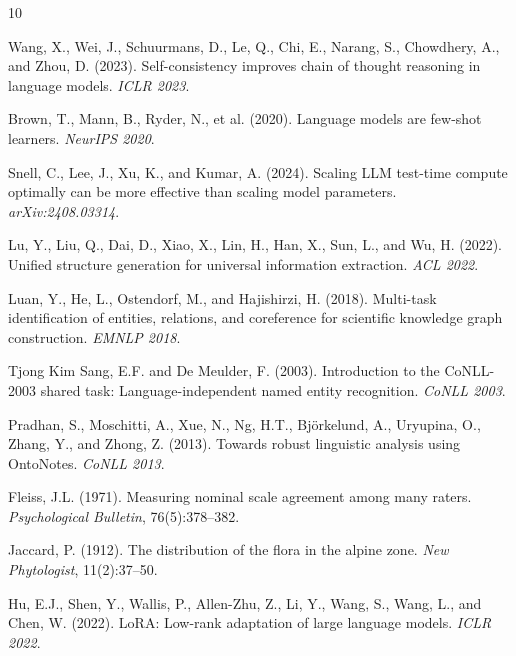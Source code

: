 \documentclass[11pt,a4paper]{article}
\begin{document}

\begin{thebibliography}{10}

Wang, X., Wei, J., Schuurmans, D., Le, Q., Chi, E., Narang, S., Chowdhery, A., and Zhou, D. (2023).
Self-consistency improves chain of thought reasoning in language models.
\textit{ICLR 2023}.

Brown, T., Mann, B., Ryder, N., et al. (2020).
Language models are few-shot learners.
\textit{NeurIPS 2020}.

Snell, C., Lee, J., Xu, K., and Kumar, A. (2024).
Scaling LLM test-time compute optimally can be more effective than scaling model parameters.
\textit{arXiv:2408.03314}.

Lu, Y., Liu, Q., Dai, D., Xiao, X., Lin, H., Han, X., Sun, L., and Wu, H. (2022).
Unified structure generation for universal information extraction.
\textit{ACL 2022}.

Luan, Y., He, L., Ostendorf, M., and Hajishirzi, H. (2018).
Multi-task identification of entities, relations, and coreference for scientific knowledge graph construction.
\textit{EMNLP 2018}.

Tjong Kim Sang, E.F. and De Meulder, F. (2003).
Introduction to the CoNLL-2003 shared task: Language-independent named entity recognition.
\textit{CoNLL 2003}.

Pradhan, S., Moschitti, A., Xue, N., Ng, H.T., Bj\"{o}rkelund, A., Uryupina, O., Zhang, Y., and Zhong, Z. (2013).
Towards robust linguistic analysis using OntoNotes.
\textit{CoNLL 2013}.

Fleiss, J.L. (1971).
Measuring nominal scale agreement among many raters.
\textit{Psychological Bulletin}, 76(5):378--382.

Jaccard, P. (1912).
The distribution of the flora in the alpine zone.
\textit{New Phytologist}, 11(2):37--50.

Hu, E.J., Shen, Y., Wallis, P., Allen-Zhu, Z., Li, Y., Wang, S., Wang, L., and Chen, W. (2022).
LoRA: Low-rank adaptation of large language models.
\textit{ICLR 2022}.

\end{thebibliography}
\end{document}

